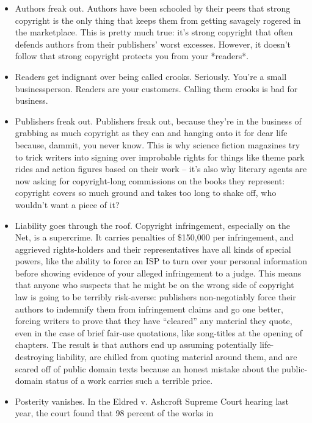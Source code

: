 \begin{itemize}
\item
  Authors freak out. Authors have been schooled by their peers that
  strong copyright is the only thing that keeps them from getting
  savagely rogered in the marketplace. This is pretty much true: it's
  strong copyright that often defends authors from their publishers'
  worst excesses. However, it doesn't follow that strong copyright
  protects you from your *readers*.
\item
  Readers get indignant over being called crooks. Seriously. You're a
  small businessperson. Readers are your customers. Calling them
  crooks is bad for business.
\item
  Publishers freak out. Publishers freak out, because they're in the
  business of grabbing as much copyright as they can and hanging onto
  it for dear life because, dammit, you never know. This is why
  science fiction magazines try to trick writers into signing over
  improbable rights for things like theme park rides and action
  figures based on their work -- it's also why literary agents are
  now asking for copyright-long commissions on the books they
  represent: copyright covers so much ground and takes too long to
  shake off, who wouldn't want a piece of it?
\item
  Liability goes through the roof. Copyright infringement, especially
  on the Net, is a supercrime. It carries penalties of \$150,000 per
  infringement, and aggrieved rights-holders and their
  representatives have all kinds of special powers, like the ability
  to force an ISP to turn over your personal information before
  showing evidence of your alleged infringement to a judge. This
  means that anyone who suspects that he might be on the wrong side
  of copyright law is going to be terribly risk-averse: publishers
  non-negotiably force their authors to indemnify them from
  infringement claims and go one better, forcing writers to prove
  that they have ``cleared'' any material they quote, even in the case
  of brief fair-use quotations, like song-titles at the opening of
  chapters. The result is that authors end up assuming potentially
  life-destroying liability, are chilled from quoting material around
  them, and are scared off of public domain texts because an honest
  mistake about the public-domain status of a work carries such a
  terrible price.
\item
  Posterity vanishes. In the Eldred v. Ashcroft Supreme Court hearing
  last year, the court found that 98 percent of the works in

\end{itemize}
